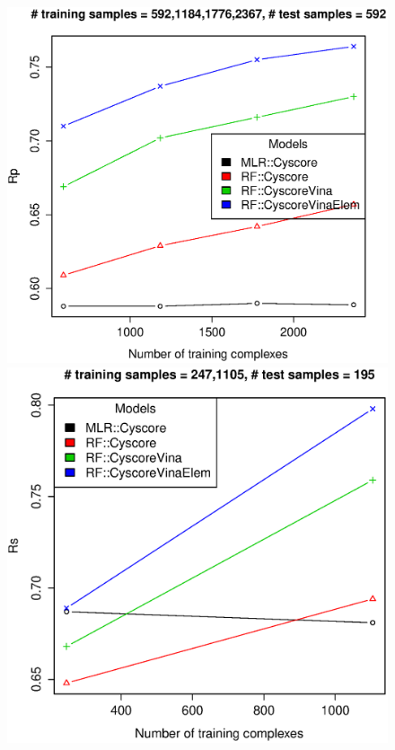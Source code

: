 \documentclass[journal=jacsat,manuscript=article]{achemso}
\begin{document}
\begin{figure}[ht!]
\includegraphics[width=\linewidth]{../rfcyscore/tst-592-pcor.eps}
\endminipage
\\
\includegraphics[width=\linewidth]{../rfcyscore/tst-195-scor.eps}
\endminipage
{}

\end{figure}
\end{document}

